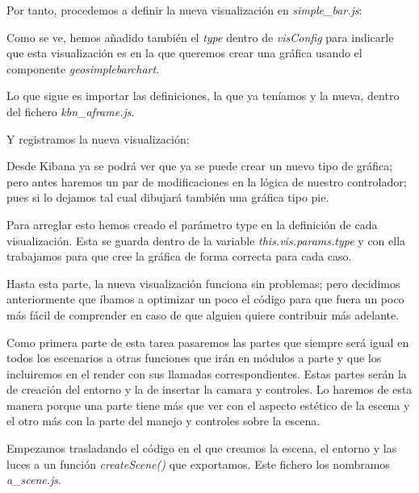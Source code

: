 \documentclass[a4paper, 12pt]{book}
\begin{document}
Por tanto, procedemos a definir la nueva visualización en \textit{simple\_bar.js}:



Como se ve, hemos añadido también el \textit{type} dentro de \textit{visConfig} para indicarle que esta visualización es en la que queremos crear una gráfica usando el componente \textit{geosimplebarchart}.

Lo que sigue es importar las definiciones, la que ya teníamos y la nueva, dentro del fichero \textit{kbn\_aframe.js}.



Y registramos la nueva visualización:



Desde Kibana ya se podrá ver que ya se puede crear un nuevo tipo de gráfica; pero antes haremos un par de modificaciones en la lógica de nuestro controlador; pues si lo dejamos tal cual dibujará también una gráfica tipo pie.

Para arreglar esto hemos creado el parámetro type en la definición de cada visualización. Esta se guarda dentro de la variable \textit{this.vis.params.type} y con ella trabajamos para que cree la gráfica de forma correcta para cada caso.



Hasta esta parte, la nueva visualización funciona sin problemas; pero decidimos anteriormente que íbamos a optimizar un poco el código para que fuera un poco más fácil de comprender en caso de que alguien quiere contribuir más adelante.

Como primera parte de esta tarea pasaremos las partes que siempre será igual en todos los escenarios a otras funciones que irán en módulos a parte y que los incluiremos en el render con sus llamadas correspondientes. Estas partes serán la de creación del entorno y la de insertar la camara y controles. Lo haremos de esta manera porque una parte tiene más que ver con el aspecto estético de la escena y el otro más con la parte del manejo y controles sobre la escena.

Empezamos trasladando el código en el que creamos la escena, el entorno y las luces a un función \textit{createScene()} que exportamos. Este fichero los nombramos \textit{a\_scene.js}.
\end{document}
